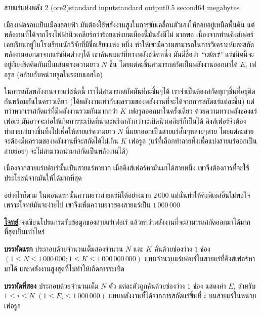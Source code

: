 \documentclass[11pt,a4paper]{article}
\begin{document}
\begin{problem}{สายแร่แห่งพลัง 2 (ore2)}{standard input}{standard output}{0.5 second}{64 megabytes}

    เมืองเฟอรอนเป็นเมืองลอยฟ้า มันต้องใช้พลังงานสูงในการขับเคลื่อนตัวเองให้ลอยอยู่เหนือพื้นดิน แต่พลังงานที่ได้จากโรงไฟฟ้านิวเคลียร์กว่าร้อยแห่งบนเมืองนี้มันยังมีไม่ มากพอ เนื่องจากท่านคิงส์เฟอร์เคยเรียนอยู่ในโรงเรียนนักวิจัยที่มีชื่อเสียงแห่ง หนึ่ง ทำให้เขามีความสามารถในการวิเคราะห์และสกัดพลังงานออกมาจากแร่ชนิดต่างๆได้ เขาค้นพบแร่ที่ทรงพลังชนิดหนึ่ง มันมีชื่อว่า \textit{“เฟอเร่”} แร่ชนิดนี้จะอยู่เรียงชิดติดกันเป็นเส้นตรงความยาว $N$ ชิ้น โดยแต่ละชิ้นสามารถสกัดเป็นพลังงานออกมาได้ $E_i$ เฟอรูล (คล้ายกับหน่วยจูลในระบบเอสไอ) 
    
   ในการสกัดพลังงานจากแร่ชนิดนี้ เราไม่สามารถสกัดมันทีละชิ้นๆได้ เราจำเป็นต้องสกัดทุกๆชิ้นที่อยู่ติดกันพร้อมกันในคราวเดียว (ได้พลังงานเท่ากับผลรวมของพลังงานที่จะได้จากการสกัดแร่แต่ละชิ้น) แต่ทว่าหากเราสกัดแร่ที่มีพลังงานรวมกันมากกว่า $K$ เฟอรูลออกมาในครั้งเดียว ด้วยความทรงพลังของแร่เฟอเร่ มันอาจจะก่อให้เกิดการระเบิดที่น่าสะพรึงกลัวกว่าระเบิดนิวเคลียร์ก็เป็นได้ คิงส์เฟอร์จึงต้องทำลายแร่บางชิ้นทิ้งไปเพื่อให้สายแร่ความยาว $N$ นี้แยกออกเป็นสายแร่สั้นๆหลายๆสาย โดยแต่ละสายจะต้องมีผลรวมของพลังงานที่จะสกัดได้ไม่เกิน $K$ เฟอรูล (แร่ที่เลือกทำลายทิ้งเพื่อแบ่งสายแร่ออกเป็นสายย่อยๆ จะไม่สามารถนำมาสกัดเป็นพลังงานได้)

          เนื่องจากสายแร่เฟอเร่นั้นเป็นสายแร่หายาก เมื่อคิงส์เฟอร์หามันมาได้สายหนึ่ง เขาจึงต้องการที่จะใช้ประโยชน์จากมันให้ได้มากที่สุด 

          อย่างไรก็ตาม ในตอนแรกนั้นความยาวสายแร่มีได้อย่างมาก $2\,000$ แต่นั่นทำให้คิงพีเอสอิ๊นไม่พอใจเพราะโจทย์มันจะง่ายไป เขาจึงเพิ่มความยาวของสายแร่เป็น $1\,000\,000$

\bigskip
\underline{\textbf{โจทย์}}  จงเขียนโปรแกรมรับข้อมูลของสายแร่เฟอเร่ แล้วหาว่าพลังงานที่จะสามารถสกัดออกมาได้มากที่สุดเป็นเท่าไหร่


\InputFile

\textbf{บรรทัดแรก} ประกอบด้วยจำนวนเต็มสองจำนวน $N$ และ $K$ คั่นด้วยช่องว่าง $1$ ช่อง $(1 \leq N \leq 1\,000\, 000; 1 \leq K \leq 1\,000\,000\,000)$ แทนจำนวนแร่เฟอเร่ในสายแร่ที่คิงส์เฟอร์หามาได้ และพลังงานสูงสุดที่ไม่ทำให้เกิดการระเบิด 

\textbf{บรรทัดที่สอง} ประกอบด้วยจำนวนเต็ม $N$ ตัว แต่ละตัวถูกคั่นด้วยช่องว่าง $1$ ช่อง แสดงค่า $E_i$ สำหรับ $1 \leq i \leq N$ $(1 \leq E_i \leq 1\,000\,000)$ แทนพลังงานที่ได้จากการสกัดแร่ชิ้นที่ $i$ บนสายแร่ในหน่วยเฟอรูล




\end{problem}
\end{document}
